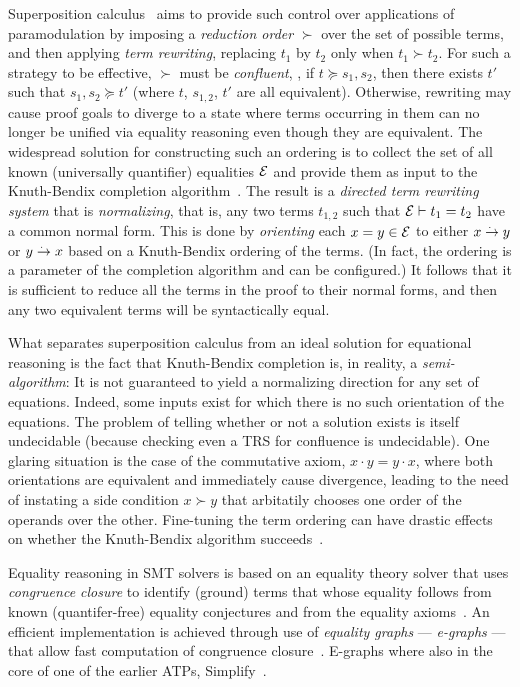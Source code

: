 Superposition calculus~\cite{superposition} aims to provide such control over applications of paramodulation
by imposing a \emph{reduction order} $\succ$ over the set of possible terms, and then applying \emph{term rewriting}, replacing $t_1$ by $t_2$ only when $t_1\succ t_2$.
For such a strategy to be effective, $\succ$ must be \emph{confluent}, \ie, if $t\succeq s_1,s_2$, then there
exists $t'$ such that $s_1,s_2 \succeq t'$ (where $t$, $s_{1,2}$, $t'$ are all equivalent).
Otherwise, rewriting may cause proof goals to diverge to
a state where terms occurring in them can no longer be unified via equality reasoning even though they are equivalent.
The widespread solution for constructing such an ordering is to collect the set of all known (universally quantifier) equalities $\mathcal{E}$ and provide them as input to the Knuth-Bendix completion algorithm~\cite{AR1983:Knuth}.
The result is a \emph{directed term rewriting system} that is \emph{normalizing}, that is, any two terms $t_{1,2}$ such that $\mathcal{E}\vdash t_1=t_2$
have a common normal form.
This is done by \emph{orienting} each $x=y \in \mathcal{E}$ to either $x\overset{.~}{\to} y$ or $y\overset{.~}{\to} x$ based on a Knuth-Bendix ordering of the terms.
(In fact, the ordering is a parameter of the completion algorithm and can be configured.)
It follows that it is sufficient to reduce all the terms in the proof to their normal forms, and then any two equivalent terms will be syntactically equal.

What separates superposition calculus from an ideal solution for equational reasoning is the fact that Knuth-Bendix completion is, in reality, a \emph{semi-algorithm}:
It is not guaranteed to yield a normalizing direction for any set of equations.
Indeed, some inputs exist for which there is no such orientation of the equations.
The problem of telling whether or not a solution exists is itself undecidable (because checking even a TRS for confluence is undecidable).
One glaring situation is the case of the commutative axiom, $x\cdot y = y\cdot x$, where both orientations are equivalent and immediately cause divergence,
leading to the need of instating a side condition $x\succ y$ that arbitatily chooses one order of the operands over the other.
Fine-tuning the term ordering can have drastic effects on whether the Knuth-Bendix algorithm succeeds~\cite{ICRTA2006:Wehrman}.

Equality reasoning in SMT solvers is based on an equality theory solver that uses \emph{congruence closure} to identify (ground) terms that whose equality follows from known (quantifer-free) equality conjectures and from the equality axioms~\cite{JACM1980:Nelson}.
An efficient implementation is achieved through use of \emph{equality graphs} --- \emph{e-graphs} --- that allow fast computation of congruence closure~\cite{Thesis1980:Nelson}.
E-graphs where also in the core of one of the earlier ATPs, Simplify~\cite{simplify}.

